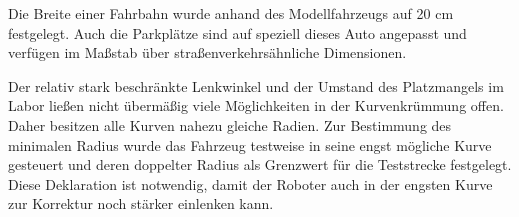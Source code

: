 Die Breite einer Fahrbahn wurde anhand des Modellfahrzeugs auf 20 cm festgelegt. Auch die Parkplätze sind auf speziell dieses Auto angepasst und verfügen im Maßstab über straßenverkehrsähnliche Dimensionen.

Der relativ stark beschränkte Lenkwinkel und der Umstand des Platzmangels im Labor ließen nicht übermäßig viele Möglichkeiten in der Kurvenkrümmung offen. Daher besitzen alle Kurven nahezu gleiche Radien. Zur Bestimmung des minimalen Radius wurde das Fahrzeug testweise in seine engst mögliche Kurve gesteuert und deren doppelter Radius als Grenzwert für die Teststrecke festgelegt. Diese Deklaration ist notwendig, damit der Roboter auch in der engsten Kurve zur Korrektur noch stärker einlenken kann.

